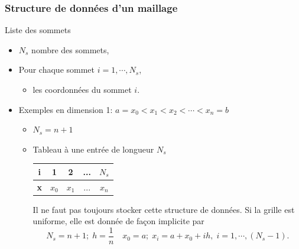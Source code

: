 \documentclass{beamer}
\begin{document}
\begin{frame}
\frametitle{Structure de données d'un maillage}
{\huge Liste des sommets}
\begin{itemize}
\item  $N_s$ nombre des sommets,
\item  Pour chaque sommet $i=1,\cdots, N_s$,
    \begin{itemize}
        \item les coordonnées du sommet $i$.
     \end{itemize}
\item Exemples en dimension 1: $a=x_0<x_1<x_2<\cdots<x_n=b$
\begin{itemize}
\item $N_s=n+1$
\item Tableau à une entrée de longueur $N_s$
\begin{center}
\begin{tabular}{|c|c|c|c|c|}\hline 
{\bf i} & 1 & 2 & ... & $N_s$ \\ \hline 
{\bf x} & $x_0$ & $x_1$ & ... & $x_n$ \\ \hline 
\end{tabular}
\end{center}
Il ne faut pas toujours stocker cette structure de données. Si la grille est uniforme, elle est donnée de façon implicite par
\[N_s=n+1;\; h=\frac{1}{n}\quad x_0=a;\; x_i=a+x_0+ih,\; i=1,\cdots,(N_s-1).\]
\end{itemize}
\end{itemize}
\end{frame}
\end{document}
